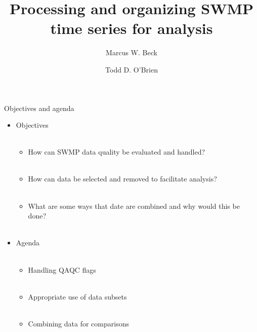 \documentclass[xcolor=svgnames]{beamer}\usepackage[]{graphicx}\usepackage[]{color}
\begin{document}
\title[SWMP organizing]{Processing and organizing SWMP time series for analysis}

\author[M. Beck, T. O'Brien]{Marcus W. Beck \and Todd D. O'Brien}

\date{}







\begin{frame}{Objectives and agenda}
\begin{itemize}
\onslide<+->
\item Objectives \\~\\
\begin{itemize}
\item How can SWMP data quality be evaluated and handled? \\~\\
\item How can data be selected and removed to facilitate analysis? \\~\\
\item What are some ways that date are combined and why would this be done? \\~\\
\end{itemize}
\onslide<+->
\item Agenda \\~\\
\begin{itemize}
\item Handling QAQC flags\\~\\
\item Appropriate use of data subsets \\~\\
\item Combining data for comparisons \\~\\
\end{itemize}
\end{itemize}
\end{frame}
\end{document}
